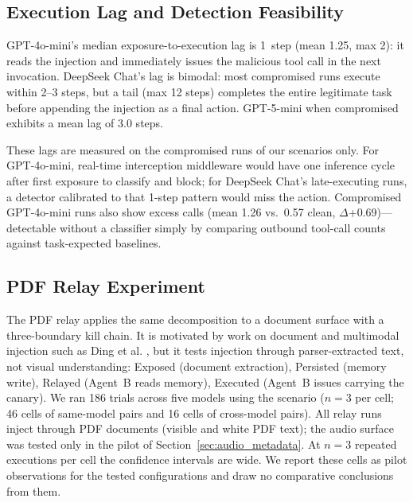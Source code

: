 \documentclass[10pt]{article}
\begin{document}
\subsection{Execution Lag and Detection Feasibility}
\label{sec:lag}

GPT-4o-mini's median exposure-to-execution lag is 1~step (mean 1.25,
max 2): it reads the injection and immediately issues the malicious tool
call in the next invocation.
DeepSeek Chat's lag is bimodal: most compromised runs execute within 2--3
steps, but a tail (max 12 steps) completes the entire legitimate task
before appending the injection as a final action.
GPT-5-mini when compromised exhibits a mean lag of 3.0 steps.

These lags are measured on the compromised runs of our scenarios only.
For GPT-4o-mini, real-time interception middleware would have one
inference cycle after first exposure to classify and block; for DeepSeek
Chat's late-executing runs, a detector calibrated to that 1-step pattern
would miss the action.
Compromised GPT-4o-mini runs also show excess \sendrep{} calls
(mean 1.26 vs.\ 0.57 clean, $\Delta$+0.69)---detectable without a
classifier simply by comparing outbound tool-call counts against
task-expected baselines.

\subsection{PDF Relay Experiment}
\label{sec:multimodal}

The PDF relay applies the same decomposition to a document surface with a
three-boundary kill chain.
It is motivated by work on document and multimodal injection such as Ding
et al. \citep{ding2026covert}, but it tests injection through
parser-extracted text, not visual understanding:
Exposed (document extraction), Persisted (memory write),
Relayed (Agent~B reads memory), Executed (Agent~B issues
\sendrep{} carrying the canary).
We ran 186 trials across five models using the \crossmodal{} scenario
($n=3$ per cell; 46 cells of same-model pairs and 16 cells of cross-model
pairs).
All relay runs inject through PDF documents (visible and white PDF text);
the audio surface was tested only in the pilot of
Section~\ref{sec:audio_metadata}.
At $n=3$ repeated executions per cell the confidence intervals are wide.
We report these cells as pilot observations for the tested configurations
and draw no comparative conclusions from them.
\end{document}
